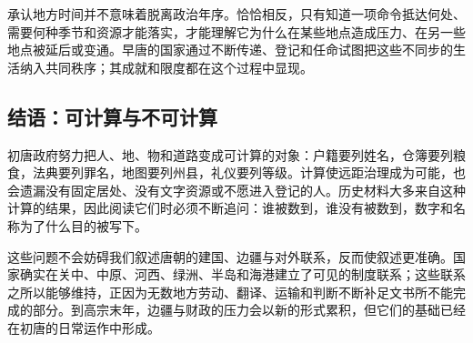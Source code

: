 承认地方时间并不意味着脱离政治年序。恰恰相反，只有知道一项命令抵达何处、需要何种季节和资源才能落实，才能理解它为什么在某些地点造成压力、在另一些地点被延后或变通。早唐的国家通过不断传递、登记和任命试图把这些不同步的生活纳入共同秩序；其成就和限度都在这个过程中显现。

\subsection{结语：可计算与不可计算}
初唐政府努力把人、地、物和道路变成可计算的对象：户籍要列姓名，仓簿要列粮食，法典要列罪名，地图要列州县，礼仪要列等级。计算使远距治理成为可能，也会遗漏没有固定居处、没有文字资源或不愿进入登记的人。历史材料大多来自这种计算的结果，因此阅读它们时必须不断追问：谁被数到，谁没有被数到，数字和名称为了什么目的被写下。

这些问题不会妨碍我们叙述唐朝的建国、边疆与对外联系，反而使叙述更准确。国家确实在关中、中原、河西、绿洲、半岛和海港建立了可见的制度联系；这些联系之所以能够维持，正因为无数地方劳动、翻译、运输和判断不断补足文书所不能完成的部分。到高宗末年，边疆与财政的压力会以新的形式累积，但它们的基础已经在初唐的日常运作中形成。
